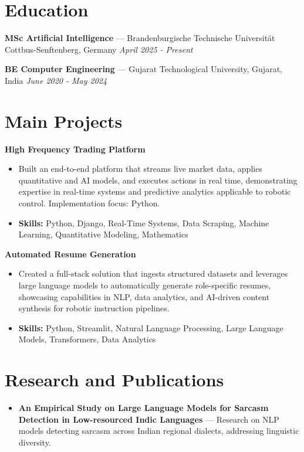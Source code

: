 \documentclass[a4paper,10pt]{article}
\begin{document}
\section*{Education}
\textbf{MSc Artificial Intelligence} — Brandenburgische Technische Universität Cottbus-Senftenberg, Germany \hfill \textit{April 2025 - Present}\par
\vspace{1.5pt}
\textbf{BE Computer Engineering} — Gujarat Technological University, Gujarat, India \hfill \textit{June 2020 - May 2024}\par

\section*{Main Projects}
\textbf{High Frequency Trading Platform}\par
\vspace{1pt}
\begin{itemize}
  \item Built an end-to-end platform that streams live market data, applies quantitative and AI models, and executes actions in real time, demonstrating expertise in real-time systems and predictive analytics applicable to robotic control. Implementation focus: Python.
  \item \textbf{Skills:} Python, Django, Real-Time Systems, Data Scraping, Machine Learning, Quantitative Modeling, Mathematics
\end{itemize}
\vspace{3pt}
\textbf{Automated Resume Generation}\par
\vspace{1pt}
\begin{itemize}
  \item Created a full-stack solution that ingests structured datasets and leverages large language models to automatically generate role-specific resumes, showcasing capabilities in NLP, data analytics, and AI-driven content synthesis for robotic instruction pipelines.
  \item \textbf{Skills:} Python, Streamlit, Natural Language Processing, Large Language Models, Transformers, Data Analytics
\end{itemize}

\section*{Research and Publications}
\begin{itemize}
\item \textbf{An Empirical Study on Large Language Models for Sarcasm Detection in Low-resourced Indic Languages} — Research on NLP models detecting sarcasm across Indian regional dialects, addressing linguistic diversity.
\end{itemize}
\end{document}

